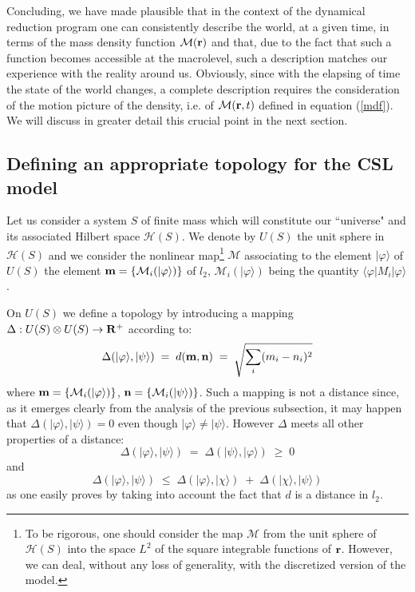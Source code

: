 \documentclass[12pt]{article}
\begin{document}
Concluding, we have made plausible that in the context of the
dynamical reduction program one can consistently describe the
world, at a given time, in terms of the mass density function
${\mathcal M}({\bf r})$ and that, due to the fact that such a function
becomes accessible at the macrolevel, such a description matches our
experience with the reality around us. Obviously, since with the elapsing
of time the state of the world changes, a complete description requires
the consideration of the motion picture of the density, i.e. of
${\mathcal M}({\bf r}, t)$ defined in equation (\ref{mdf}). We will
discuss in greater detail this crucial point in the next section.

\subsection{Defining an appropriate topology for the CSL model}
\label{sec124}

Let us consider a system $S$ of finite mass which will constitute
our ``universe" and its associated Hilbert space ${\mathcal
H}(S)$. We denote by $U(S)$ the unit sphere in ${\mathcal H}(S)$
and we consider the nonlinear map\footnote{To be rigorous, one
should consider the map ${\mathcal M}$ from the unit sphere of
${\mathcal H}(S)$ into the space $L^{2}$ of the square integrable
functions of ${\bf r}$. However, we can deal, without any loss of
generality, with the discretized version of the model.} ${\mathcal
M}$ associating to the element $|\varphi\rangle$ of $U(S)$ the
element ${\bf m} = \{ {\mathcal M}_{i}(|\varphi\rangle) \}$ of
$l_{2}$, $ {\mathcal M}_{i}(|\varphi\rangle)$ being the quantity
$\langle\varphi|M_{i}|\varphi\rangle$.

On $U(S)$ we define a topology by introducing a mapping $\Delta :
U(S) \otimes U(S) \rightarrow {\bf R}^{+}$ according to:
\begin{equation}
\Delta (|\varphi\rangle, |\psi\rangle) \; = \; d({\bf m}, {\bf n})
\; = \; \sqrt{\sum_{i}(m_{i} - n_{i})^{2}}
\end{equation}
where ${\bf m} = \{ {\mathcal M}_{i}(|\varphi\rangle) \}$, ${\bf
n} = \{ {\mathcal M}_{i}(|\psi\rangle) \}$. Such a mapping is not
a distance since, as it emerges clearly from the analysis of the
previous subsection, it may happen that $\Delta (|\varphi\rangle,
|\psi\rangle) = 0$ even though $|\varphi\rangle \neq
|\psi\rangle$. However $\Delta$ meets all other properties of a
distance:
\begin{equation}
\Delta (|\varphi\rangle, |\psi\rangle) \; = \; \Delta
(|\psi\rangle, |\varphi\rangle) \; \geq \; 0
\end{equation}
and
\begin{equation}
\Delta (|\varphi\rangle, |\psi\rangle) \; \leq \; \Delta
(|\varphi\rangle, |\chi\rangle) \; + \; \Delta (|\chi\rangle,
|\psi\rangle)
\end{equation}
as one  easily proves by taking into account the fact that $d$ is
a distance in $l_{2}$.
\end{document}
